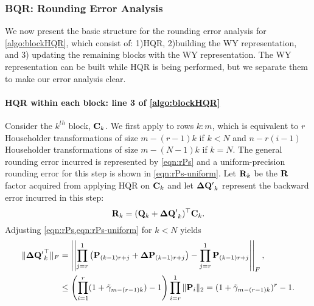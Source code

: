 \subsubsection{BQR: Rounding Error Analysis}
We now present the basic structure for the rounding error analysis for \cref{algo:blockHQR}, which consist of: 1)HQR, 2)building the WY representation, and 3) updating the remaining blocks with the WY representation.
The WY representation can be built while HQR is being performed, but we separate them to make our error analysis clear. 
\paragraph{HQR within each block: line 3 of \cref{algo:blockHQR}}
Consider the $k^{th}$ block, $\mathbf{C}_k$. 
We first apply  to rows $k:m$, which is equivalent to $r$ Householder transformations of size $m-(r-1)k$ if $k < N$ and $n-r(i-1)$ Householder transformations of size $m-(N-1)k$ if $k=N$. 
The general rounding error incurred is represented by \cref{eqn:rPs} and a uniform-precision rounding error for this step is shown in \cref{eqn:rPs-uniform}.
Let $\mathbf{R}_k$ be the $\mathbf{R}$ factor acquired from applying HQR on $\mathbf{C}_k$ and let $\mathbf{\Delta Q'}_k$ represent the backward error incurred in this step:
\begin{equation*}
	\mathbf{R}_k = (\mathbf{Q}_k+\mathbf{\Delta Q'}_k)^{\top}\mathbf{C}_k.
\end{equation*}
Adjusting \cref{eqn:rPs,eqn:rPs-uniform} for $k<N$ yields
\begin{align}
\|\bb{\Delta Q'}_k^{\top}\|_F &= \left|\left| \prod_{j=r}^{1}\left(\bb{P}_{(k-1)r+j} +\bb{\Delta P}_{(k-1)r+j}\right) - \prod_{j=r}^{1}\bb{P}_{(k-1)r+j} \right|\right|_F,\label{eqn:rPs-BQR}\\
&\leq \left(\prod_{i=1}^r(1+\tilde{\gamma}_{m-(r-1)k})-1\right)\prod_{i=r}^1\|\bb{P}_i\|_2 = (1+\tilde{\gamma}_{m-(r-1)k})^r-1. \label{eqn:rPs-BQR-uniform}
\end{align}
